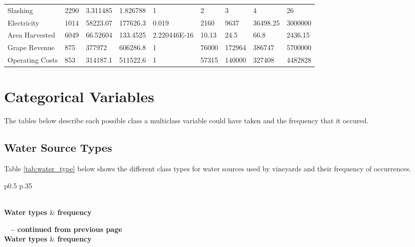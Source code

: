 \documentclass[review,12pt,authoryear]{elsarticle}
\begin{document}
\begin{linenumbers}
\begin{table}[htb]
{\begin{tabular}{@{}lllllllll@{}}
  Slashing & 2290 & 3.311485 & 1.826788 & 1 & 2 & 3 & 4 & 26 \\
  Electricity & 1014 & 58223.07 & 177626.3 & 0.019 & 2160 & 9637 & 36498.25 & 3000000 \\
  Area Harvested & 6049 & 66.52604 & 133.4525 & 2.220446E-16 & 10.13 & 24.5 & 66.8 & 2436.15 \\
  Grape Revenue & 875 & 377972 & 606286.8 & 1 & 76000 & 172964 & 386747 & 5700000 \\
  Operating Costs & 853 & 314187.1 & 511522.6 & 1 & 57315 & 140000 & 327408 & 4482828 \\ \bottomrule
  \end{tabular}}
  \end{table}
\clearpage

  \section{Categorical Variables}
  The tables below describe each possible class a multiclass variable could have taken and the frequency that it occured.
  \subsection{Water Source Types}
  Table \ref{tab:water_type} below shows the different class types for water sources used by vineyards and their frequency of occurrences.

\begin{center}
  \begin{longtable}{p{0.5\linewidth} p{.35\linewidth}}
    \caption{Frequency and class types of water types used by vineyards.}\label{tab:water_type} \\
  
  \hline \textbf{Water types} & \textbf{frequency}\\ \hline 
  \endfirsthead
  
  {{\bfseries \tablename\ \thetable{} -- continued from previous page}} \\
  \hline \textbf{Water types} & \textbf{frequency} \\ \hline 
  \endhead
  
  \hline {} \\ \hline
  \endfoot
  

\end{longtable}
\end{center}
\end{linenumbers}
\end{document}

